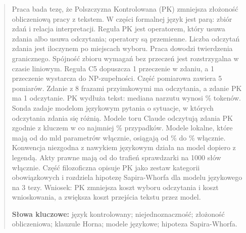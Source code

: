 \begin{abstract}
\noindent
Praca bada tezę, że Polszczyzna Kontrolowana (PK) zmniejsza złożoność obliczeniową pracy
z tekstem. W części formalnej język jest parą: zbiór zdań i relacja interpretacji.
Reguła PK jest operatorem, który usuwa zdania albo usuwa odczytania; operatory są
przemienne. Liczba odczytań zdania jest iloczynem po miejscach wyboru. Praca dowodzi
twierdzenia granicznego. Spójność zbioru wymagań bez przeczeń jest rozstrzygalna w czasie
liniowym. Reguła C5 dopuszcza 1 przeczenie w zdaniu, a 1 przeczenie wystarcza do
NP-zupełności. Część pomiarowa zawiera 5 pomiarów. Zdanie z 8 frazami przyimkowymi ma
\pkAttachEight{} odczytania, a zdanie PK ma 1 odczytanie. PK wydłuża tekst: mediana narzutu
wynosi \pkTokMedian{} \% tokenów. Sonda zadaje \pkProbeModels{} modelom językowym pytania
o sytuacje, w których odczytania zdania się różnią. Modele toru Claude odczytują zdania PK
zgodnie z kluczem w co najmniej \pkAccPkClaudeMin{} \% przypadków. Modele lokalne, które
mają od \pkLocalParamMin{} do \pkLocalParamMax{} mld parametrów włącznie, osiągają od \pkAccPkLocalMin{} \%
do \pkAccPkLocalMax{} \% włącznie. Konwencja niezgodna z nawykiem językowym działa na
model dopiero z legendą. Akty prawne mają od \pkCorpusActMin{} do \pkCorpusActMax{}
trafień sprawdzarki na 1000 słów włącznie. Część filozoficzna opisuje PK jako zestaw
kategorii obowiązkowych i rozdziela hipotezę Sapira-Whorfa dla modelu językowego na
3 tezy. Wniosek: PK zmniejsza koszt wyboru odczytania i koszt wnioskowania, a zwiększa
koszt przejścia tekstu przez model.

\smallskip
\noindent\textbf{Słowa kluczowe:} język kontrolowany; niejednoznaczność; złożoność
obliczeniowa; klauzule Horna; modele językowe; hipoteza Sapira-Whorfa.
\end{abstract}
